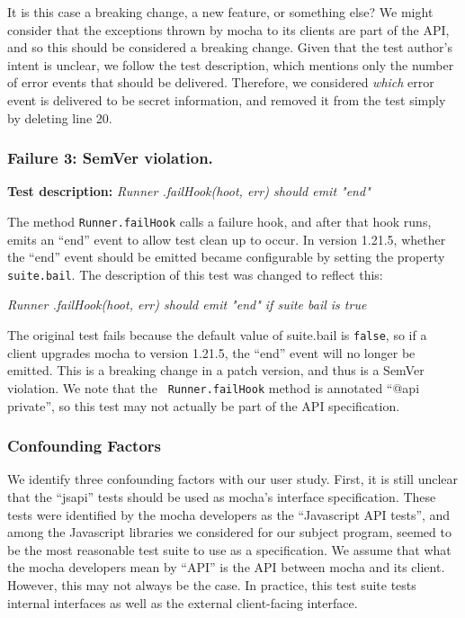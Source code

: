 It is this case a breaking change, a new feature, or something else?
We might consider that the exceptions thrown by mocha to its clients
are part of the API, and so this should be considered a breaking
change.  Given that the test author's intent is unclear, we follow the
test description, which mentions only the number of error events that
should be delivered. Therefore, we considered {\em which} error event
is delivered to be secret information, and removed it from the test
simply by deleting line 20.

\subsubsection{Failure 3: SemVer violation.}

{\bf Test description:}
%
{\em Runner .failHook(hoot, err) should emit "end" }

The method {\tt Runner.failHook} calls a failure hook, and after that
hook runs, emits an ``end'' event to allow test clean up to occur. In
version 1.21.5, whether the ``end'' event should be emitted became
configurable by setting the property {\tt suite.bail}.  The
description of this test was changed to reflect this:

{\em Runner .failHook(hoot, err) should emit "end" if suite bail is
  true }

The original test fails because the default value of suite.bail is
{\tt false}, so if a client upgrades mocha to version 1.21.5, the
``end'' event will no longer be emitted. This is a breaking change in
a patch version, and thus is a SemVer violation. We note that the {\tt
  Runner.failHook} method is annotated ``@api private'', so this test
may not actually be part of the API specification.

\subsubsection{Confounding Factors}
We identify three confounding factors with our user study. First, it
is still unclear that the ``jsapi'' tests should be used as mocha's
interface specification. These tests were identified by the mocha
developers as the ``Javascript API tests'', and among the Javascript
libraries we considered for our subject program, seemed to be the most
reasonable test suite to use as a specification. We assume that what
the mocha developers mean by ``API'' is the API between mocha and its
client. However, this may not always be the case. In practice, this
test suite tests internal interfaces as well as the external
client-facing interface.

